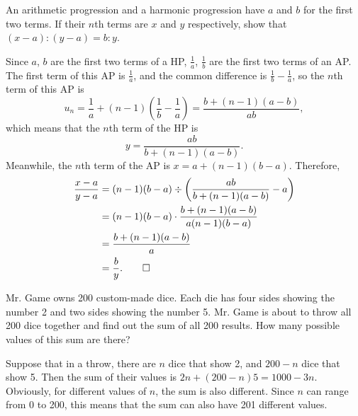 \begin{question}
    An arithmetic progression and a harmonic progression have $a$ and $b$ for
    the first two terms. If their $n$th terms are $x$ and $y$ respectively,
    show that $(x - a) : (y - a) = b : y$. 
\end{question}
\begin{solution}
    Since $a$, $b$ are the first two terms of a HP, $\frac{1}{a}$,
    $\frac{1}{b}$ are the first two terms of an AP. The first term of this AP
    is $\frac{1}{a}$, and the common difference is $\frac{1}{b} - \frac{1}{a}$,
    so the $n$th term of this AP is
    \[ u_n = \frac{1}{a} + (n - 1)\left( \frac{1}{b} - \frac{1}{a} \right) =
    \frac{b + (n - 1)(a - b)}{ab}, \]
    which means that the $n$th term of the HP is 
    \[ y = \frac{ab}{b + (n - 1)(a - b)}. \]
    Meanwhile, the $n$th term of the AP is $x = a + (n - 1)(b - a)$. Therefore, 
    \begin{align*}
        \frac{x - a}{y - a} &= (n - 1)(b - a) \div \left( \frac{ab}{b + (n - 1)(a - b)} - a \right)\\
        &= (n - 1)(b - a) \cdot \frac{b + (n - 1)(a - b)}{a(n - 1)(b - a)}\\
        &= \frac{b + (n - 1)(a - b)}{a}\\
        &= \frac{b}{y}. \qedhere
    \end{align*}
\end{solution}

\begin{question}
    Mr. Game owns 200 custom-made dice. Each die has four sides showing the
    number 2 and two sides showing the number 5. Mr. Game is about to throw all
    200 dice together and find out the sum of all 200 results. How many
    possible values of this sum are there?
\end{question}
\begin{solution}
    Suppose that in a throw, there are $n$ dice that show 2, and $200 - n$ dice
    that show 5. Then the sum of their values is $2n + (200 - n)5 = 1000 - 3n$.
    Obviously, for different values of $n$, the sum is also different. Since
    $n$ can range from 0 to 200, this means that the sum can also have 201
    different values. 
\end{solution}

